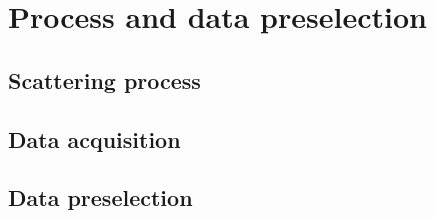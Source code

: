 \section{Process and data preselection}
\subsection{Scattering process}
\subsection{Data acquisition}
\subsection{Data preselection}
